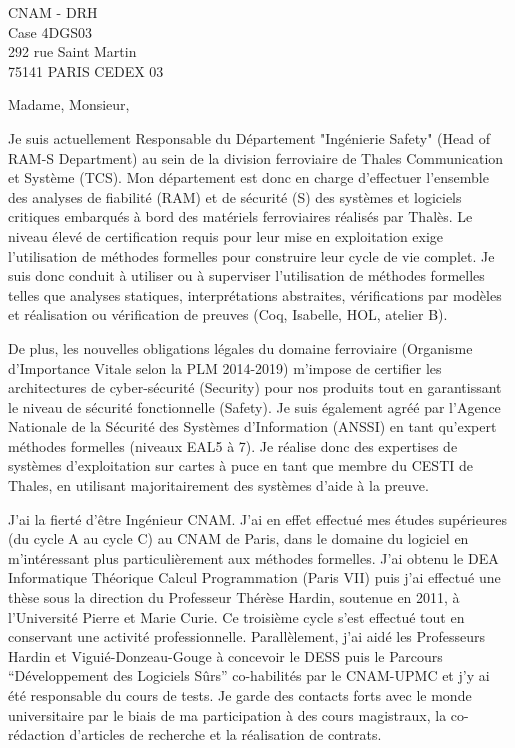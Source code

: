 \documentclass[a4paper,12pt]{lettre}
\begin{document}
 
\begin{letter}{
    CNAM - DRH\\
    Case 4DGS03\\
    292 rue Saint Martin\\ 
    75141 PARIS CEDEX 03}
  
\date{le 20 avril 2015} 
 
\def\concname{Objet :~}

\opening{Madame, Monsieur,}
 
 Je suis actuellement Responsable du D\'epartement "Ing\'enierie
 Safety" (Head of RAM-S Department) au sein de la division ferroviaire
 de Thales Communication et Syst\`eme (TCS). Mon d\'epartement est
 donc en charge d'effectuer l'ensemble des analyses de fiabilit\'e
 (RAM) et de s\'ecurit\'e (S) des syst\`emes et logiciels critiques
 embarqu\'es \`a bord des mat\'eriels ferroviaires r\'ealis\'es par
 Thal\`es. Le niveau \'elev\'e de certification requis pour leur mise
 en exploitation exige l'utilisation de m\'ethodes formelles pour
 construire leur cycle de vie complet. Je suis donc conduit \`a
 utiliser ou \`a superviser l'utilisation de m\'ethodes formelles
 telles que analyses statiques, interpr\'etations abstraites,
 v\'erifications par mod\`eles et r\'ealisation ou v\'erification de
 preuves (Coq, Isabelle, HOL, atelier B).

De plus, les nouvelles obligations l\'egales du domaine ferroviaire
(Organisme d'Importance Vitale selon la PLM 2014-2019) m'impose de
certifier les architectures de cyber-s\'ecurit\'e (Security) pour nos
produits tout en garantissant le niveau de s\'ecurit\'e fonctionnelle
(Safety). Je suis \'egalement agr\'e\'e par l'Agence Nationale de la
S\'ecurit\'e des Syst\`emes d'Information (ANSSI) en tant qu'expert
m\'ethodes formelles (niveaux EAL5 \`a 7). Je r\'ealise donc des
expertises de syst\`emes d'exploitation sur cartes \`a puce en tant
que membre du CESTI de Thales, en utilisant majoritairement des
syst\`emes d'aide \`a la preuve.

J'ai la fiert\'e d'\^etre Ing\'enieur CNAM. J'ai en effet effectu\'e
mes \'etudes sup\'erieures (du cycle A au cycle C) au CNAM de Paris,
dans le domaine du logiciel en m'int\'eressant plus particuli\`erement
aux m\'ethodes formelles. J'ai obtenu le DEA Informatique Th\'eorique
Calcul Programmation (Paris VII) puis j'ai effectu\'e une th\`ese sous
la direction du Professeur Th\'er\`ese Hardin, soutenue en 2011, \`a
l'Universit\'e Pierre et Marie Curie. Ce troisi\`eme cycle s'est
effectu\'e tout en conservant une activit\'e
professionnelle. Parall\`element, j'ai aid\'e les Professeurs Hardin
et Vigui\'e-Donzeau-Gouge \`a concevoir le DESS puis le Parcours
``D\'eveloppement des Logiciels S\^urs'' co-habilit\'es par le CNAM-UPMC
et j'y ai \'et\'e responsable du cours de tests. Je garde des contacts
forts avec le monde universitaire par le biais de ma participation \`a
des cours magistraux, la co-r\'edaction d'articles de recherche et la
r\'ealisation de contrats.


\end{letter}
\end{document}
